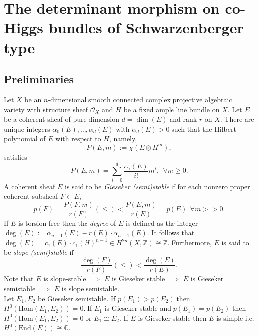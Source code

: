 \documentclass[12pt]{amsart}
\theoremstyle{definition}
\theoremstyle{remark}
\numberwithin{equation}{section}
\begin{document}
\section{The determinant morphism on co-Higgs bundles of Schwarzenberger type}

\subsection{Preliminaries}

Let $X$ be an $n$-dimensional smooth connected complex projective algebraic variety with structure sheaf $\mathcal{O}_X$ and $H$ be a fixed ample line bundle on $X$. Let $E$ be a coherent sheaf of pure dimension $d = \dim (E)$ and rank $r$ on $X$. There are unique integers $\alpha_0(E),\dots, \alpha_d(E)$ with $\alpha_d(E) > 0$ such that the Hilbert polynomial of $E$ with respect to $H$, namely, 
\begin{equation}
P(E, m) := \chi\left(E\otimes H^m\right), 
\end{equation}
satisfies 
\begin{equation}
P(E, m) = \sum_{i = 0}^d \frac{\alpha_i(E)}{i!}m^i, ~~\forall m\geq 0.
\end{equation}
A coherent sheaf $E$ is said to be \textit{Gieseker (semi)stable} if for each nonzero proper coherent subsheaf $F\subset E$,
\begin{equation}
p(F) = \frac{P(F, m)}{r(F)}(\leq) < \frac{P(E, m)}{r(E)} = p(E)~~\forall m>> 0.
\end{equation}
If $E$ is torsion free then the \textit{degree} of $E$ is defined as the integer $\deg(E) := \alpha_{n-1}(E) - r(E)\cdot\alpha_{n-1}(E).$ It follows that $\deg(E) = c_1(E)\cdot c_1(H)^{n-1}\in H^{2n}(X, \mathbb{Z})\cong\mathbb{Z}$. Furthermore, $E$ is said to be \textit{slope (semi)stable} if 
\begin{equation}
\frac{\deg(F)}{r(F)}(\leq) <\frac{\deg(E)}{r(E)}.
\end{equation}
Note that $E$ is slope-stable $\implies$ $E$ is Gieseker stable $\implies$ $E$ is Gieseker semistable $\implies$ $E$ is slope semistable.\\

Let $E_1, E_2$ be Gieseker semistable. If $p(E_1) > p(E_2)$ then $H^0(\mbox{Hom}(E_1, E_2)) = 0$. If $E_1$ is Gieseker stable and $p(E_1) = p(E_2)$ then $H^0(\mbox{Hom}(E_1, E_2)) = 0$ or $E_1\cong E_2$. If $E$ is Gieseker stable then $E$ is simple i.e. $H^0(\mbox{End}(E))\cong\mathbb{C}$.\\
\end{document}
